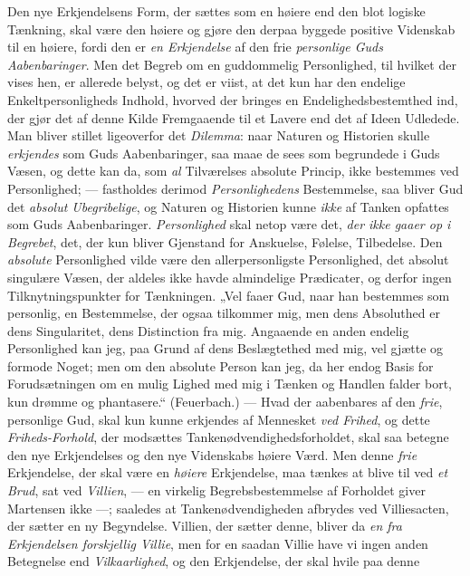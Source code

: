 \documentclass[12pt,a4paper]{book}
\newcommand{\opage}[1]{\marginnote{\footnotesize\textit{[#1]}}}
\begin{document}
Den nye Erkjendelsens Form, der sættes som en høiere end den blot logiske Tænkning, skal
være den høiere og gjøre den derpaa byggede positive Videnskab til en høiere, fordi den er
\emph{en Erkjendelse} af den frie \emph{personlige Guds Aabenbaringer}. Men det Begreb om en
guddommelig Personlighed, til hvilket der vises hen, er allerede belyst, og det er viist,
at det kun har den endelige Enkeltpersonligheds Indhold, hvorved der bringes en
Endelighedsbestemthed ind, der gjør det af denne Kilde Fremgaaende til et Lavere end det
af Ideen Udledede. Man bliver stillet ligeoverfor det \emph{Dilemma}: naar Naturen og Historien skulle \emph{erkjendes} som Guds Aabenbaringer, saa maae de sees som begrundede i Guds Væsen, og dette kan da, som \emph{al} Tilværelses absolute Princip, ikke bestemmes ved Personlighed; --- fastholdes derimod \emph{Personlighedens} Bestemmelse, saa bliver Gud det \emph{absolut Ubegribelige}, og Naturen og Historien kunne \emph{ikke} af Tanken opfattes som Guds
Aabenbaringer. \emph{Personlighed} skal netop være det, \emph{der ikke gaaer op i Begrebet}, det,
der kun bliver Gjenstand for Anskuelse, Følelse, Tilbedelse. Den \emph{absolute} Personlighed vilde være den allerpersonligste Personlighed, det absolut singulære Væsen,
der aldeles ikke havde almindelige Prædicater, og derfor ingen Tilknytningspunkter for
Tænkningen. „Vel faaer Gud, naar han bestemmes som personlig, en Bestemmelse, der ogsaa
tilkommer mig, men dens Absoluthed er dens Singularitet, dens Distinction fra mig.
Angaaende en anden endelig Personlighed kan jeg, \opage{107}paa Grund af dens Beslægtethed med mig,
vel gjætte og formode Noget; men om den absolute Person kan jeg, da her endog Basis for
Forudsætningen om en mulig Lighed med mig i Tænken og Handlen falder bort, kun drømme og
phantasere.“ (Feuerbach.) --- Hvad der aabenbares af den \emph{frie}, personlige Gud, skal kun
kunne erkjendes af Mennesket \emph{ved Frihed}, og dette \emph{Friheds-Forhold}, der
modsættes Tankenødvendighedsforholdet, skal saa betegne den nye Erkjendelses og den
nye Videnskabs høiere Værd. Men denne \emph{frie} Erkjendelse, der skal være en \emph{høiere}
Erkjendelse, maa tænkes at blive til ved \emph{et Brud}, sat ved \emph{Villien}, --- en virkelig
Begrebsbestemmelse af Forholdet giver Martensen ikke ---; saaledes at Tankenødvendigheden
afbrydes ved Villiesacten, der sætter en ny Begyndelse. Villien, der sætter denne, bliver da \emph{en fra Erkjendelsen forskjellig Villie}, men for en saadan Villie have vi ingen
anden Betegnelse end \emph{Vilkaarlighed}, og den Erkjendelse, der skal hvile paa denne
\end{document}
